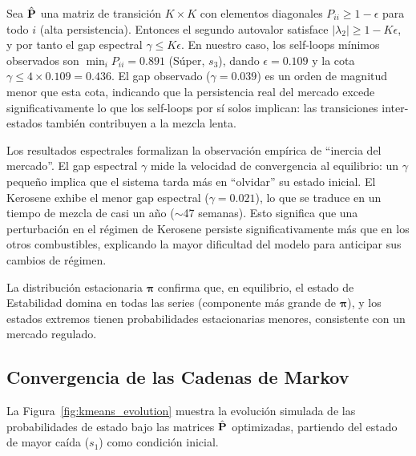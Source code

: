 \begin{remark}
\label{obs:selfloops_gap}
Sea $\hat{\mathbf{P}}$ una matriz de transición $K \times K$ con
elementos diagonales $P_{ii} \ge 1 - \epsilon$ para todo $i$
(alta persistencia).  Entonces el segundo autovalor satisface
$|\lambda_2| \ge 1 - K\epsilon$, y por tanto el gap espectral
$\gamma \le K\epsilon$.  En nuestro caso, los self-loops mínimos
observados son $\min_i P_{ii} = 0.891$ (Súper, $s_3$), dando
$\epsilon = 0.109$ y la cota $\gamma \le 4 \times 0.109 = 0.436$.
El gap observado ($\gamma = 0.039$) es un orden de magnitud menor
que esta cota, indicando que la persistencia real del mercado
excede significativamente lo que los self-loops por sí solos
implican: las transiciones inter-estados también contribuyen a
la mezcla lenta.
\end{remark}

Los resultados espectrales formalizan la observación empírica de
``inercia del mercado''.  El gap espectral $\gamma$ mide la
velocidad de convergencia al equilibrio: un $\gamma$ pequeño implica
que el sistema tarda más en ``olvidar'' su estado inicial.  El
Kerosene exhibe el menor gap espectral ($\gamma = 0.021$), lo que se
traduce en un tiempo de mezcla de casi un año ($\sim$47 semanas).
Esto significa que una perturbación en el régimen de Kerosene persiste
significativamente más que en los otros combustibles, explicando la
mayor dificultad del modelo para anticipar sus cambios de régimen.

La distribución estacionaria $\boldsymbol{\pi}$ confirma que, en
equilibrio, el estado de Estabilidad domina en todas las series
(componente más grande de $\boldsymbol{\pi}$), y los estados extremos
tienen probabilidades estacionarias menores, consistente con un
mercado regulado.

\subsection{Convergencia de las Cadenas de Markov}
\label{subsec:convergencia}

La Figura~\ref{fig:kmeans_evolution} muestra la evolución simulada de
las probabilidades de estado bajo las matrices $\hat{\mathbf{P}}$
optimizadas, partiendo del estado de mayor caída ($s_1$) como
condición inicial.

